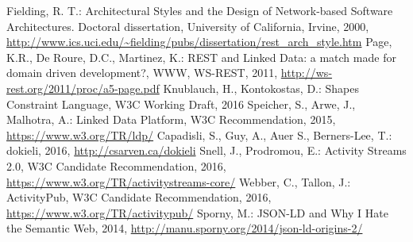 \documentclass[a4paper]{llncs}
\begin{document}
\begin{thebibliography}{99}
   Fielding, R. T.: Architectural Styles and the Design of Network-based Software Architectures. Doctoral dissertation, University of California, Irvine, 2000,  \url{http://www.ics.uci.edu/~fielding/pubs/dissertation/rest_arch_style.htm}
   Page, K.R., De Roure, D.C., Martinez, K.: REST and Linked Data: a match made for domain driven development?, WWW, WS-REST, 2011,  \url{http://ws-rest.org/2011/proc/a5-page.pdf}
   Knublauch, H., Kontokostas, D.: Shapes Constraint Language, W3C Working Draft, 2016
   Speicher, S., Arwe, J., Malhotra, A.: Linked Data Platform, W3C Recommendation, 2015, \url{https://www.w3.org/TR/ldp/}
   Capadisli, S., Guy, A., Auer S., Berners-Lee, T.: dokieli, 2016, \url{http://csarven.ca/dokieli}
   Snell, J., Prodromou, E.: Activity Streams 2.0, W3C Candidate Recommendation, 2016, \url{https://www.w3.org/TR/activitystreams-core/}
   Webber, C., Tallon, J.: ActivityPub, W3C Candidate Recommendation, 2016, \url{https://www.w3.org/TR/activitypub/}
   Sporny, M.: JSON-LD and Why I Hate the Semantic Web, 2014, \url{http://manu.sporny.org/2014/json-ld-origins-2/}
\end{thebibliography}
\end{document}
